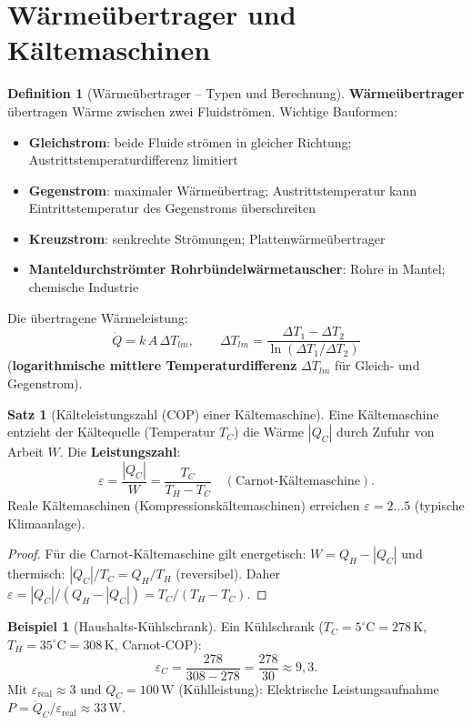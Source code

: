 ﻿\documentclass[a4paper,12pt]{report}
\theoremstyle{definition}
\newtheorem{definition}{Definition}
\newtheorem{beispiel}{Beispiel}
\newtheorem{satz}{Satz}
\begin{document}


\section{Wärmeübertrager und Kältemaschinen}

\begin{definition}[Wärmeübertrager -- Typen und Berechnung]
\textbf{Wärmeübertrager} übertragen Wärme zwischen zwei Fluidströmen.
Wichtige Bauformen:
\begin{itemize}
    \item[-] \textbf{Gleichstrom}: beide Fluide strömen in gleicher Richtung;
          Austrittstemperaturdifferenz limitiert
    \item[-] \textbf{Gegenstrom}: maximaler Wärmeübertrag; Austrittstemperatur
          kann Eintrittstemperatur des Gegenstroms überschreiten
    \item[-] \textbf{Kreuzstrom}: senkrechte Strömungen; Plattenwärmeübertrager
    \item[-] \textbf{Manteldurchströmter Rohrbündelwärmetauscher}:
          Rohre in Mantel; chemische Industrie
\end{itemize}
Die übertragene Wärmeleistung:
\[
  \dot{Q} = k\,A\,\Delta T_{lm}, \qquad
  \Delta T_{lm} = \frac{\Delta T_1 - \Delta T_2}{\ln(\Delta T_1/\Delta T_2)}
\]
(\textbf{logarithmische mittlere Temperaturdifferenz} $\Delta T_{lm}$
für Gleich- und Gegenstrom).
\end{definition}

\begin{satz}[Kälteleistungszahl (COP) einer Kältemaschine]
Eine Kältemaschine entzieht der Kältequelle (Temperatur $T_C$) die
Wärme $|Q_C|$ durch Zufuhr von Arbeit $W$.
Die \textbf{Leistungszahl}:
\[
  \varepsilon = \frac{|Q_C|}{W} = \frac{T_C}{T_H - T_C} \quad (\text{Carnot-Kältemaschine}).
\]
Reale Kältemaschinen (Kompressionskältemaschinen) erreichen
$\varepsilon = 2\ldots5$ (typische Klimaanlage).
\end{satz}
\begin{proof}
Für die Carnot-Kältemaschine gilt energetisch: $W = Q_H - |Q_C|$
und thermisch: $|Q_C|/T_C = Q_H/T_H$ (reversibel).
Daher $\varepsilon = |Q_C|/(Q_H - |Q_C|) = T_C/(T_H - T_C)$.
\end{proof}

\begin{beispiel}[Haushalts-Kühlschrank]
Ein Kühlschrank ($T_C = 5^\circ\mathrm{C} = 278\,\mathrm{K}$,
$T_H = 35^\circ\mathrm{C} = 308\,\mathrm{K}$, Carnot-COP):
\[
  \varepsilon_C = \frac{278}{308 - 278} = \frac{278}{30} \approx 9{,}3.
\]
Mit $\varepsilon_{\text{real}} \approx 3$ und $\dot{Q}_C = 100\,\mathrm{W}$ (Kühlleistung):
Elektrische Leistungsaufnahme $P = \dot{Q}_C/\varepsilon_{\text{real}} \approx 33\,\mathrm{W}$.
\end{beispiel}
\end{document}
